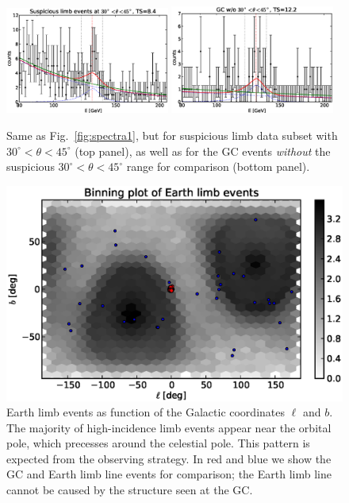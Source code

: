 \documentclass[aps,twocolumn,prd,superscriptaddress,showpacs,nofootinbib,fixfloat]{revtex4}
\begin{document}
\begin{figure}
  \centering
  \includegraphics[width=0.48\textwidth]{plots/counts_suspiciousLimb.eps}
  \includegraphics[width=0.48\textwidth]{plots/counts_GC_wo3045.eps}
  \caption{Same as Fig.~\ref{fig:spectra1}, but for
  suspicious limb data subset with
  $30^\circ<\theta<45^\circ$ (top panel), as well as for the
  GC events \emph{without} the suspicious
  $30^\circ<\theta<45^\circ$ range for comparison (bottom panel).}
  \label{fig:spectra2}
\end{figure}

\begin{figure}
  \centering
  \includegraphics[width=1.0\linewidth]{plots/limb_l_b.eps}
  \caption{Earth limb events as function of the Galactic coordinates $\ell$
  and $b$.  The majority of high-incidence limb events appear near the orbital
  pole, which precesses around the celestial pole. This pattern is expected
  from the observing strategy. In red and blue we show the GC and Earth limb
  line events for comparison; the Earth limb line cannot be caused by the
  structure seen at the GC.}
  \label{fig:l-b}
\end{figure}
\end{document}
